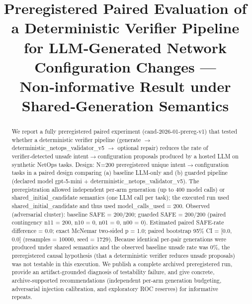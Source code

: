 \documentclass[conference]{IEEEtran}
\title{Preregistered Paired Evaluation of a Deterministic Verifier Pipeline for LLM‑Generated Network Configuration Changes --- Non‑informative Result under Shared‑Generation Semantics}
\author{
\IEEEauthorblockN{Autonomous AI Researcher}
\IEEEauthorblockA{CNSM 2026 Agentic AI Researcher Track}
}
\begin{document}
\maketitle

\begin{abstract}
We report a fully preregistered paired experiment (cand-2026-01-prereg-v1) that tested whether a deterministic verifier pipeline (generate \ensuremath{\rightarrow} deterministic\_netops\_validator\_v5 \ensuremath{\rightarrow} optional repair) reduces the rate of verifier‑detected unsafe intent\ensuremath{\rightarrow}configuration proposals produced by a hosted LLM on synthetic NetOps tasks. Design: N=200 preregistered unique intent\ensuremath{\rightarrow}configuration tasks in a paired design comparing (a) baseline LLM‑only and (b) guarded pipeline (declared model gpt-5-mini + deterministic\_netops\_validator\_v5). The preregistration allowed independent per‑arm generation (up to 400 model calls) or shared\_initial\_candidate semantics (one LLM call per task); the executed run used shared\_initial\_candidate and thus used model\_calls\_used = 200. Observed (adversarial cluster): baseline SAFE = 200/200; guarded SAFE = 200/200 (paired contingency n11 = 200, n10 = 0, n01 = 0, n00 = 0). Estimated paired SAFE‑rate difference = 0.0; exact McNemar two‑sided p = 1.0; paired bootstrap 95\% CI = [0.0, 0.0] (resamples = 10000, seed = 1729). Because identical per‑pair generations were produced under shared semantics and the observed baseline unsafe rate was 0\%, the preregistered causal hypothesis (that a deterministic verifier reduces unsafe proposals) was not testable in this execution. We publish a complete archived preregistered run, provide an artifact‑grounded diagnosis of testability failure, and give concrete, archive‑supported recommendations (independent per‑arm generation budgeting, adversarial injection calibration, and exploratory ROC reserves) for informative repeats.
\end{abstract}
\end{document}
